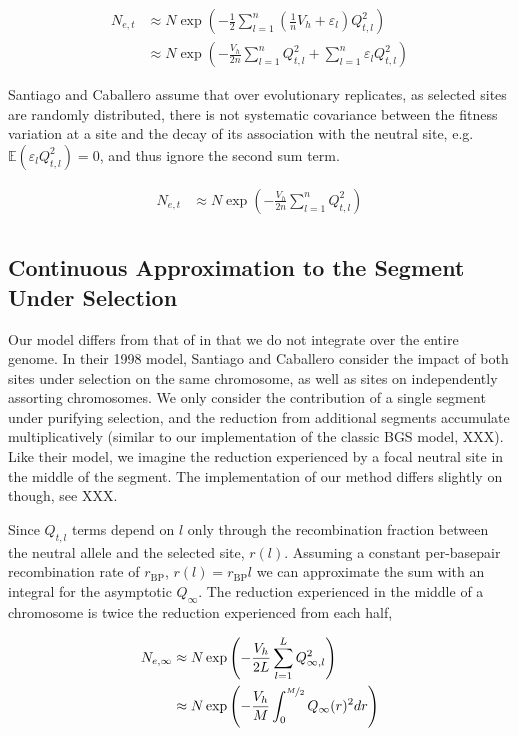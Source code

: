 \documentclass[11pt]{article}
\newcommand{\E}{\mathbb{E}}
\begin{document}
\begin{align}
  N_{e,t} &\approx N \exp\left(- \frac{1}{2}\sum_{l=1}^n \left(\frac{1}{n}V_{h} + \varepsilon_l\right)  Q_{t,l}^2\right) \\
          &\approx N \exp\left(- \frac{V_{h}}{2n} \sum_{l=1}^n Q_{t,l}^2+ \sum_{l=1}^n \varepsilon_l  Q_{t,l}^2\right)
\end{align}

Santiago and Caballero assume that over evolutionary replicates, as selected
sites are randomly distributed, there is not systematic covariance between the
fitness variation at a site and the decay of its association with the neutral
site, e.g. $\E(\varepsilon_l Q_{t,l}^2) = 0$, and thus ignore the second sum
term. 

\begin{align}
      N_{e,t} &\approx N \exp\left(- \frac{V_{h}}{2n} \sum_{l=1}^n Q_{t,l}^2\right) \\
\end{align}

\subsection{Continuous Approximation to the Segment Under Selection}

Our model differs from that of \textcite{Santiago1998-bs} in that we do not
integrate over the entire genome. In their 1998 model, Santiago and Caballero
consider the impact of both sites under selection on the same chromosome, as
well as sites on independently assorting chromosomes. We only consider the
contribution of a single segment under purifying selection, and the reduction
from additional segments accumulate multiplicatively (similar to our
implementation of the classic BGS model, XXX). Like their model, we imagine the
reduction experienced by a focal neutral site in the middle of the segment.
The implementation of our method differs slightly on though, see XXX.

Since $Q_{t,l}$ terms depend on $l$ only through the recombination fraction
between the neutral allele and the selected site, $r(l)$. Assuming a constant
per-basepair recombination rate of $r_\text{BP}$, $r(l) = r_\text{BP} l$ we can
approximate the sum with an integral for the asymptotic $Q_\infty$. The
reduction experienced in the middle of a chromosome is twice the reduction
experienced from each half, 

\begin{align}
      N_{e,\infty} &\approx N \exp\left(- \frac{V_{h}}{2L} \sum_{l=1}^L Q_{\infty,l}^2\right) \\
              &\approx N \exp\left(- \frac{V_{h}}{M} \int_0^{\nicefrac{M}{2}} Q_{\infty}(r)^2 dr \right) \\
\end{align}
\end{document}
